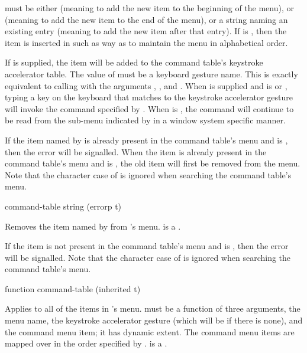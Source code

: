  must be either  (meaning to add the new item to the
beginning of the menu),  or  (meaning to add the new item to
the end of the menu), or a string naming an existing entry (meaning to add the
new item after that entry).  If  is , then the item is
inserted in such as way as to maintain the menu in alphabetical order.

If  is supplied, the item will be added to the command table's
keystroke accelerator table.  The value of  must be a keyboard
gesture name.  This is exactly equivalent to calling
 with the arguments ,
,  and .  When  is supplied
and  is  or , typing a key on the keyboard
that matches to the keystroke accelerator gesture will invoke the command
specified by .  When  is , the command will
continue to be read from the sub-menu indicated by  in a window
system specific manner.

If the item named by  is already present in the command table's menu
and  is , then the  error
will be signalled.  When the item is already present in the command table's menu
and  is , the old item will first be removed from the
menu.  Note that the character case of  is ignored when searching
the command table's menu.


 {command-table string \key (errorp t)}

Removes the item named by  from 's menu.
 is a .

If the item is not present in the command table's menu and  is
, then the  error will be signalled.  Note
that the character case of  is ignored when searching the command
table's menu.


 {function command-table \key (inherited t)}

Applies  to all of the items in 's menu.
 must be a function of three arguments, the menu name, the
keystroke accelerator gesture (which will be  if there is none), and the
command menu item; it has dynamic extent.  The command menu items are mapped
over in the order specified by .
 is a .

